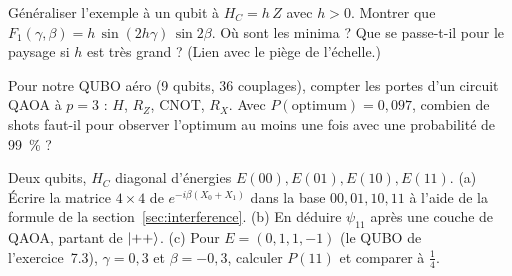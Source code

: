 \exercices
\begin{exercice}
Généraliser l'exemple à un qubit à $H_C=h\,Z$ avec $h>0$. Montrer que $F_1(\gamma,\beta)=h\,\sin(2h\gamma)\,\sin2\beta$. Où sont les minima ? Que se passe-t-il pour le paysage si $h$ est très grand ? (Lien avec le piège de l'échelle.)
\end{exercice}
\begin{exercice}
Pour notre QUBO aéro (9 qubits, 36 couplages), compter les portes d'un circuit QAOA à $p=3$ : $H$, $R_Z$, CNOT, $R_X$. Avec $P(\text{optimum})=0{,}097$, combien de shots faut-il pour observer l'optimum au moins une fois avec une probabilité de 99~\% ?
\end{exercice}
\begin{exercice}\label{ex:melangeur}
Deux qubits, $H_C$ diagonal d'énergies $E(00),E(01),E(10),E(11)$. (a) Écrire la matrice $4\times4$ de $e^{-i\beta(X_0+X_1)}$ dans la base $00,01,10,11$ à l'aide de la formule de la section~\ref{sec:interference}. (b) En déduire $\psi_{11}$ après une couche de QAOA, partant de $\lvert ++\rangle$. (c) Pour $E=(0,1,1,-1)$ (le QUBO de l'exercice~7.3), $\gamma=0{,}3$ et $\beta=-0{,}3$, calculer $P(11)$ et comparer à $\frac14$.
\end{exercice}

